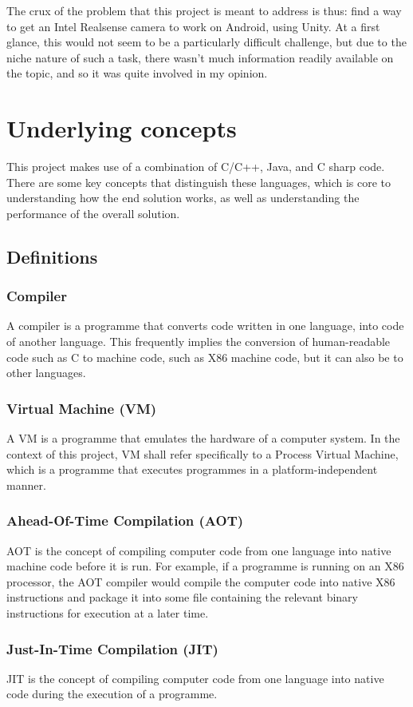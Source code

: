 The crux of the problem that this project is meant to address is thus: find a way to get an Intel Realsense camera to work on Android, using Unity. At a first glance, this would not seem to be a particularly difficult challenge, but due to the niche nature of such a task, there wasn't much information readily available on the topic, and so it was quite involved in my opinion.

\section{Underlying concepts}
This project makes use of a combination of C/C++, Java, and C sharp code. There are some key concepts that distinguish these languages, which is core to understanding how the end solution works, as well as understanding the performance of the overall solution.
    \subsection{Definitions}
        \subsubsection{Compiler} A compiler is a programme that converts code written in one language, into code of another language. This frequently implies the conversion of human-readable code such as C to machine code, such as X86 machine code, but it can also be to other languages.
        \subsubsection{Virtual Machine (VM)} A VM is a programme that emulates the hardware of a computer system. In the context of this project, VM shall refer specifically to a Process Virtual Machine, which is a programme that executes programmes in a platform-independent manner.
        \subsubsection{Ahead-Of-Time Compilation (AOT)} AOT is the concept of compiling computer code from one language into native machine code before it is run. For example, if a programme is running on an X86 processor, the AOT compiler would compile the computer code into native X86 instructions and package it into some file containing the relevant binary instructions for execution at a later time.
        \subsubsection{Just-In-Time Compilation (JIT)} JIT is the concept of compiling computer code from one language into native code during the execution of a programme.

